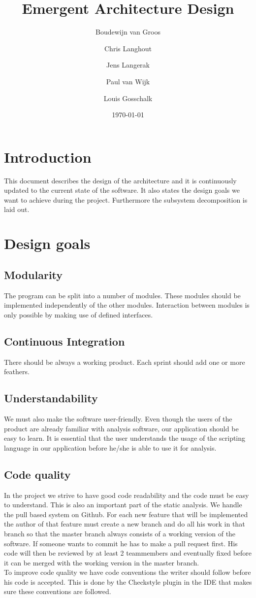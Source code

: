 \documentclass[a4paper]{article}
\title{Emergent Architecture Design}
\author[1]{Boudewijn van Groos}
\author[2]{Chris Langhout}
\author[3]{Jens Langerak}
\author[4]{Paul van Wijk}
\author[5]{Louis Gosschalk}
\affil[1]{bvangroos \\
4229843}
\affil[2]{clanghout \\
4281705}
\affil[3]{jlangerak \\
4317327}
\affil[4]{pjvanwijk \\
4285034}
\affil[5]{lgosschalk \\
4214528}
\date{\today}
\begin{document}
\maketitle
\tableofcontents
\newpage

\section{Introduction}
This document describes the design of the architecture and it is continuously updated to the current state of the software. It also states the design goals we want to achieve during the project. Furthermore the subsystem decomposition is laid out.

\section{Design goals}
\subsection{Modularity}
The program can be split into a number of modules. These modules should be implemented independently of the other modules. Interaction between modules is only possible by making use of defined interfaces.

\subsection{Continuous Integration}
There should be always a working product. Each sprint should add one or more feathers.

\subsection{Understandability}
We must also make the software user-friendly. Even though the users of the
product are already familiar with analysis software, our application should be
easy to learn. It is essential that the user understands the usage of the
scripting language in our application before he/she is able to use it for
analysis.

\subsection{Code quality}
In the project we strive to have good code readability and the code must be easy to understand. This is also an important part of the static analysis. We handle the pull based system on Github. For each new feature that will be implemented the author of that feature must create a new branch and do all his work in that branch so that the master branch always consists of a working version of the software. If someone wants to commit he has to make a pull request first. His code will then be reviewed by at least 2 teammembers and eventually fixed before it can be merged with the working version in the master branch.\\
To improve code quality we have code conventions the writer should follow before
his code is accepted. This is done by the Checkstyle plugin in the IDE that makes
sure these conventions are followed.
\end{document}

